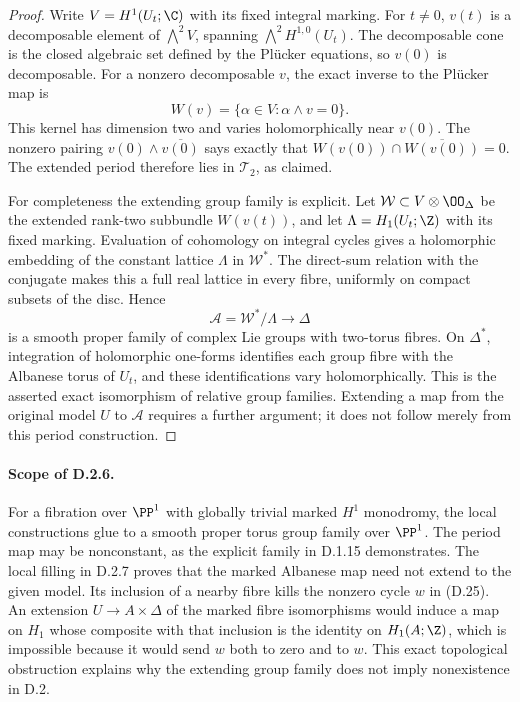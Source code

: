 \begin{proof}
Write $V=H^1(U_t;\C)$ with its fixed integral marking.
For $t\ne0$, $v(t)$ is a decomposable element of
$\bigwedge^2V$, spanning $\bigwedge^2H^{1,0}(U_t)$.
The decomposable cone is the closed algebraic set defined by
the Pl\"ucker equations, so $v(0)$ is decomposable. For a
nonzero decomposable $v$, the exact inverse to the Pl\"ucker
map is
\[
 W(v)=\{\alpha\in V:\alpha\wedge v=0\}.
\]
This kernel has dimension two and varies holomorphically near
$v(0)$. The nonzero pairing
$v(0)\wedge\overline{v(0)}$ says exactly that
$W(v(0))\cap\overline{W(v(0))}=0$. The extended period
therefore lies in $\mathcal T_2$, as claimed.

For completeness the extending group family is explicit.
Let $\mathcal W\subset V\otimes\OO_\Delta$ be the extended
rank-two subbundle $W(v(t))$, and let
$\Lambda=H_1(U_t;\Z)$ with its fixed marking. Evaluation of
cohomology on integral cycles gives a holomorphic embedding
of the constant lattice $\Lambda$ in $\mathcal W^*$.
The direct-sum relation with the conjugate makes this a full
real lattice in every fibre, uniformly on compact subsets of
the disc. Hence
\[
 \mathcal A=\mathcal W^*/\Lambda\longrightarrow\Delta
\]
is a smooth proper family of complex Lie groups with
two-torus fibres. On $\Delta^*$, integration of holomorphic
one-forms identifies each group fibre with the Albanese torus
of $U_t$, and these identifications vary holomorphically.
This is the asserted exact isomorphism of relative group
families. Extending a map from the original model $U$ to
$\mathcal A$ requires a further argument; it does not follow
merely from this period construction.
\end{proof}

\paragraph{Scope of D.2.6.}
For a fibration over $\PP^1$ with globally trivial marked
$H^1$ monodromy, the local constructions glue to a smooth
proper torus group family over $\PP^1$. The period map may
be nonconstant, as the explicit family in D.1.15 demonstrates.
The local filling in D.2.7 proves that the marked Albanese
map need not extend to the given model. Its inclusion of
a nearby fibre kills the nonzero cycle $w$ in (D.25).
An extension $U\to A\times\Delta$ of the marked fibre
isomorphisms would induce a map on $H_1$ whose composite
with that inclusion is the identity on $H_1(A;\Z)$,
which is impossible because it would send $w$ both to
zero and to $w$. This exact topological obstruction
explains why the extending group family does not imply
nonexistence in D.2.



